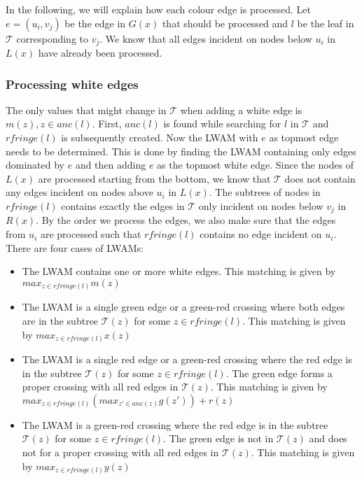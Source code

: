 In the following, we will explain how each colour edge is processed. Let $e=(u_i,v_j)$ be the edge in $G(x)$ that should be processed and $l$ be the leaf in $\mathcal{T}$ corresponding to $v_j$. We know that all edges incident on nodes below $u_i$ in $L(x)$ have already been processed.

\subsubsection{Processing white edges}
The only values that might change in $\mathcal{T}$ when adding a white edge is $m(z), z \in anc(l)$. First, $anc(l)$ is found while searching for $l$ in $\mathcal{T}$ and $rfringe(l)$ is subsequently created. Now the LWAM with $e$ as topmost edge needs to be determined. This is done by finding the LWAM containing only edges dominated by $e$ and then adding $e$ as the topmost white edge. Since the nodes of $L(x)$ are processed starting from the bottom, we know that $\mathcal{T}$ does not contain any edges incident on nodes above $u_i$ in $L(x)$. The subtrees of nodes in $rfringe(l)$ contains exactly the edges in $\mathcal{T}$ only incident on nodes below $v_j$ in $R(x)$. By the order we process the edges, we also make sure that the edges from $u_i$ are processed such that $rfringe(l)$ contains no edge incident on $u_i$. There are four cases of LWAMs:
\begin{itemize}
	\item The LWAM contains one or more white edges.
	\subitem This matching is given by $max_{z \in rfringe(l)} m(z)$
	\item The LWAM is a single green edge or a green-red crossing where both edges are in the subtree $\mathcal{T}(z)$ for some $z \in rfringe(l)$.
	\subitem This matching is given by $max_{z \in rfringe(l)} x(z)$
	\item The LWAM is a single red edge or a green-red crossing where the red edge is in the subtree $\mathcal{T}(z)$ for some $z \in rfringe(l)$. The green edge forms a proper crossing with all red edges in $\mathcal{T}(z)$.
	\subitem This matching is given by $max_{z \in rfringe(l)} (max_{z' \in anc(z)} g(z')) + r(z)$
	\item The LWAM is a green-red crossing where the red edge is in the subtree $\mathcal{T}(z)$ for some $z \in rfringe(l)$. The green edge is not in $\mathcal{T}(z)$ and does not for a proper crossing with all red edges in $\mathcal{T}(z)$.
	This matching is given by $max_{z \in rfringe(l)} y(z)$
\end{itemize}

